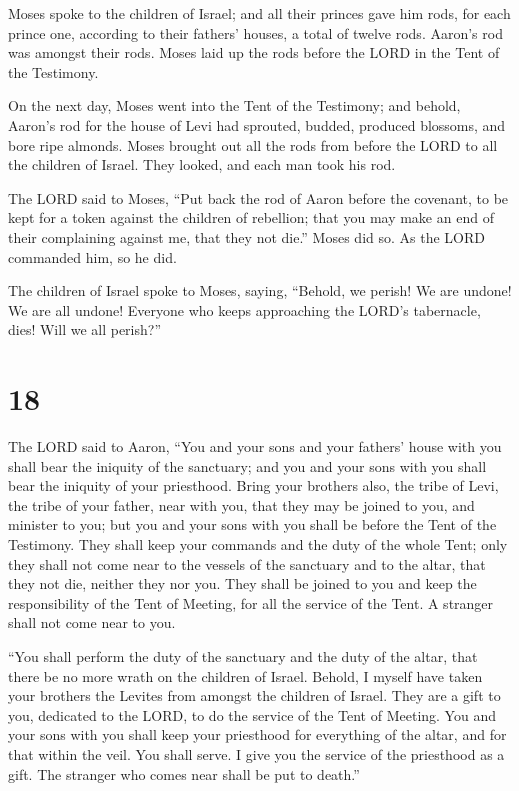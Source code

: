  Moses spoke to the children of Israel; and all their
princes gave him rods, for each prince one, according to their fathers'
houses, a total of twelve rods. Aaron's rod was amongst their rods.
 Moses laid up the rods before the LORD in the Tent of the
Testimony.

 On the next day, Moses went into the Tent of the Testimony;
and behold, Aaron's rod for the house of Levi had sprouted, budded,
produced blossoms, and bore ripe almonds.  Moses brought out
all the rods from before the LORD to all the children of Israel. They
looked, and each man took his rod.

 The LORD said to Moses, ``Put back the rod of Aaron before
the covenant, to be kept for a token against the children of rebellion;
that you may make an end of their complaining against me, that they not
die.''  Moses did so. As the LORD commanded him, so he did.

 The children of Israel spoke to Moses, saying, ``Behold,
we perish! We are undone! We are all undone!  Everyone who
keeps approaching the LORD's tabernacle, dies! Will we all perish?''

\hypertarget{section-17}{%
\section{18}\label{section-17}}

 The LORD said to Aaron, ``You and your sons and your
fathers' house with you shall bear the iniquity of the sanctuary; and
you and your sons with you shall bear the iniquity of your priesthood.
 Bring your brothers also, the tribe of Levi, the tribe of
your father, near with you, that they may be joined to you, and minister
to you; but you and your sons with you shall be before the Tent of the
Testimony.  They shall keep your commands and the duty of
the whole Tent; only they shall not come near to the vessels of the
sanctuary and to the altar, that they not die, neither they nor you.
 They shall be joined to you and keep the responsibility of
the Tent of Meeting, for all the service of the Tent. A stranger shall
not come near to you.

 ``You shall perform the duty of the sanctuary and the duty
of the altar, that there be no more wrath on the children of Israel.
 Behold, I myself have taken your brothers the Levites from
amongst the children of Israel. They are a gift to you, dedicated to the
LORD, to do the service of the Tent of Meeting.  You and
your sons with you shall keep your priesthood for everything of the
altar, and for that within the veil. You shall serve. I give you the
service of the priesthood as a gift. The stranger who comes near shall
be put to death.''

